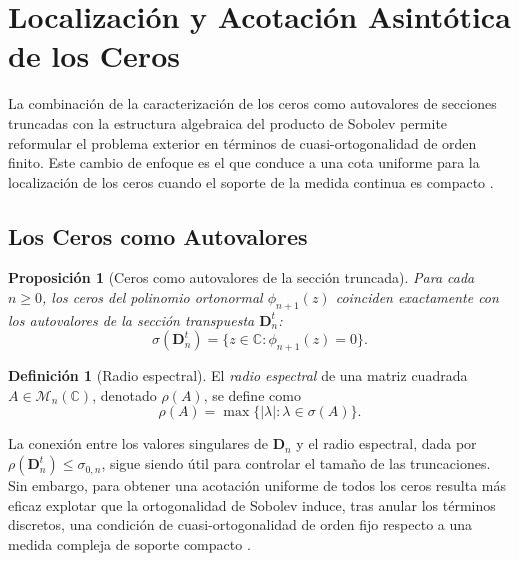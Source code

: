 \documentclass[12pt,a4paper]{article}
\newtheorem{proposition}{Proposición}
\theoremstyle{definition}
\newtheorem{definition}{Definición}
\theoremstyle{remark}
\begin{document}
\section{Localización y Acotación Asintótica de los Ceros}\label{sec:ceros_acotacion}

La combinación de la caracterización de los ceros como autovalores de secciones truncadas con la estructura algebraica del producto de Sobolev permite reformular el problema exterior en términos de cuasi-ortogonalidad de orden finito. Este cambio de enfoque es el que conduce a una cota uniforme para la localización de los ceros cuando el soporte de la medida continua es compacto \cite{lopez1999zero,lopez2001sobolev,marcellan2015sobolev}.

\subsection{Los Ceros como Autovalores}

\begin{proposition}[Ceros como autovalores de la sección truncada]\label{prop:autovalores_ceros}
	Para cada $n \ge 0$, los ceros del polinomio ortonormal $\phi_{n+1}(z)$ coinciden exactamente con los autovalores de la sección transpuesta $\mathbf{D}_n^t$:
	\[
		\sigma(\mathbf{D}_n^t) = \{z \in \mathbb{C} : \phi_{n+1}(z) = 0\}.
	\]
\end{proposition}

\begin{definition}[Radio espectral]\label{def:radio_espectral}
	El \emph{radio espectral} de una matriz cuadrada $A \in \mathcal{M}_n(\mathbb{C})$, denotado $\rho(A)$, se define como
	\[
		\rho(A) = \max\{|\lambda| : \lambda \in \sigma(A)\}.
	\]
\end{definition}

La conexión entre los valores singulares de $\mathbf{D}_n$ y el radio espectral, dada por $\rho(\mathbf{D}_n^t) \le \sigma_{0,n}$, sigue siendo útil para controlar el tamaño de las truncaciones. Sin embargo, para obtener una acotación uniforme de todos los ceros resulta más eficaz explotar que la ortogonalidad de Sobolev induce, tras anular los términos discretos, una condición de cuasi-ortogonalidad de orden fijo respecto a una medida compleja de soporte compacto \cite{lopez1999zero,marcellan2015sobolev}.
\end{document}
